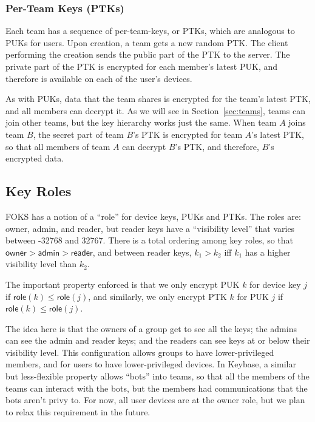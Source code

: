 \subsubsection{Per-Team Keys (PTKs)}

Each team has a sequence of per-team-keys, or PTKs, which are analogous
to PUKs for users. Upon creation, a team gets a new random PTK. The 
client performing the creation sends the public part of the PTK to the server.
The private part of the PTK is encrypted for each member's latest PUK,
and therefore is available on each of the user's devices.

As with PUKs, data that the team shares is encrypted for the team's latest PTK,
and all members can decrypt it. As we will see in Section~\ref{sec:teams}, teams can
join other teams, but the key hierarchy works just the same. When team $A$ joins
team $B$, the secret part of team $B$'s PTK is encrypted for team $A$'s latest PTK,
so that all members of team $A$ can decrypt $B$'s PTK, and therefore,
$B$'s encrypted data.

\subsection{Key Roles}

\newcommand{\owner}{\textsf{owner}}
\newcommand{\admin}{\textsf{admin}}
\newcommand{\reader}{\textsf{reader}}
\newcommand{\none}{\textsf{none}}
\newcommand{\role}[1]{\textsf{role}(#1)}


FOKS has a notion of a ``role'' for device keys, PUKs and PTKs. The roles
are: \owner, \admin, and \reader, but \reader{} keys have a ``visibility level''
that varies between -32768 and 32767. There is a total ordering among key roles,
so that $\owner > \admin > \reader$, and between reader keys, $k_1 > k_2$ iff
$k_1$ has a higher visibility level than $k_2$.

The important property enforced is that we only encrypt PUK $k$ for device key
$j$ if $\role{k} \le \role{j}$, and similarly, we only encrypt PTK $k$ for PUK
$j$ if $\role{k} \le \role{j}$.

The idea here is that the owners of a group get to see all the keys; the admins
can see the admin and reader keys; and the readers can see keys at or below
their visibility level. This configuration allows groups to have
lower-privileged members, and for users to have lower-privileged devices. In
Keybase, a similar but less-flexible property allows ``bots'' into teams, so that
all the members of the teams can interact with the bots, but the members had
communications that the bots aren't privy to.  For now, all user
devices are at the \owner{} role, but we plan to relax this requirement in the
future.

